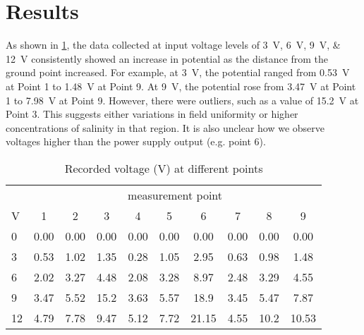 \documentclass[10pt,journal,twoside]{IEEEtran}
\begin{document}
\section{Results}
As shown in \cref{tab:voltage_data}, the data collected at input voltage levels of \qtylist{3;6;9;12}{\volt} consistently showed an increase in potential as the distance from the ground point increased. For example, at \qty{3}{\volt}, the potential ranged from \qty{0.53}{\volt} at Point 1 to \qty{1.48}{\volt} at Point 9. At \qty{9}{\volt}, the potential rose from \qty{3.47}{\volt} at Point 1 to \qty{7.98}{\volt} at Point 9. However, there were outliers, such as a value of \qty{15.2}{\volt} at Point 3. This suggests either variations in field uniformity or higher concentrations of salinity in that region. It is also unclear how we observe voltages higher than the power supply output (e.g. point 6). 
\begin{table}
\caption{Recorded voltage (\unit{\volt}) at different points}
\label{tab:voltage_data}
\begin{center}
\scriptsize
\begin{tabular}{lccccccccc}
\toprule
& \multicolumn{9}{c}{measurement point} \\
\unit{\volt} & 1 & 2 & 3 & 4 & 5 & 6 & 7 & 8 & 9 \\
\midrule
0  & 0.00 & 0.00 & 0.00 & 0.00 & 0.00 & 0.00 & 0.00 & 0.00 & 0.00 \\
3  & 0.53 & 1.02 & 1.35 & 0.28 & 1.05 & 2.95 & 0.63 & 0.98 & 1.48 \\
6  & 2.02 & 3.27 & 4.48 & 2.08 & 3.28 & 8.97 & 2.48 & 3.29 & 4.55 \\
9  & 3.47 & 5.52 & 15.2 & 3.63 & 5.57 & 18.9 & 3.45 & 5.47 & 7.87 \\
12 & 4.79 & 7.78 & 9.47 & 5.12 & 7.72 & 21.15 & 4.55 & 10.2 & 10.53 \\
\bottomrule
\end{tabular}
\end{center}
\end{table}
\end{document}
